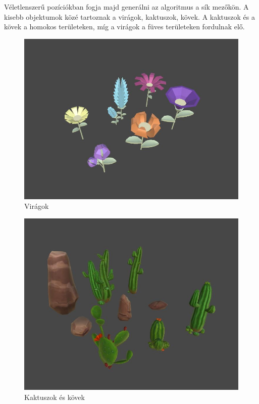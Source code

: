 Véletlenszerű pozíciókban fogja majd generálni az algoritmus a sík mezőkön. A kisebb objektumok közé tartoznak a virágok, kaktuszok, kövek. A kaktuszok és a kövek a homokos területeken, míg a virágok a füves területeken fordulnak elő.

\begin{figure}[h!]
\centering
\includegraphics[scale=0.5]{kepek/img11_4_7_4.JPG}
\caption{Virágok}
\label{fig:img11_4_7_4}
\end{figure}

\begin{figure}[h!]
\centering
\includegraphics[scale=0.5]{kepek/img11_4_7_5.JPG}
\caption{Kaktuszok és kövek}
\label{fig:img11_4_7_5}
\end{figure}

